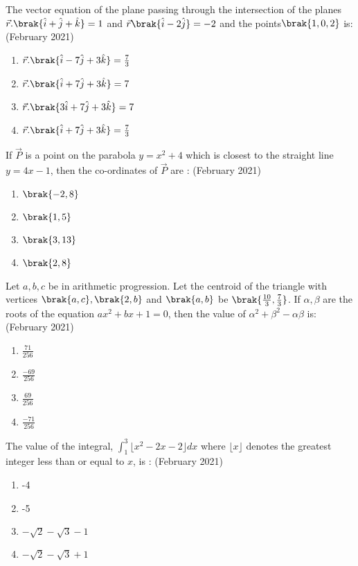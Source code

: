     \item The vector equation of the plane passing through the intersection of the planes $\vec{r}.\brak{\hat{i}+\hat{j}+\hat{k}}=1$ and $\vec{r}\brak{\hat{i}-2\hat{j}}=-2$ and the points$\brak{1,0,2}$ is:
  \hfill{(February 2021)} 
	\begin{enumerate}
        \item $\vec{r}.\brak{\hat{i}-7\hat{j}+3\hat{k}}=\frac{7}{3}$
        \item $\vec{r}.\brak{\hat{i}+7\hat{j}+3\hat{k}}=7$
        \item $\vec{r}.\brak{3\hat{i}+7\hat{j}+3\hat{k}}=7$
        \item $\vec{r}.\brak{\hat{i}+7\hat{j}+3\hat{k}}=\frac{7}{3}$
    \end{enumerate}
    \item If $\vec{P}$ is a point on the parabola $y = x^2 + 4$ which is closest to the straight line $y = 4x-1$, then the co-ordinates of $\vec{P}$ are :
    \hfill{(February 2021)} 
	\begin{enumerate}
        \item $\brak{-2,8}$
        \item $\brak{1,5}$
        \item $\brak{3,13}$
        \item $\brak{2,8}$
    \end{enumerate}
    \item Let $a, b, c$ be in arithmetic progression. Let the centroid of the triangle with vertices $\brak{a, c}, \brak{2, b}$ and $\brak{a, b}$ be $\brak{\frac{10}{3}, \frac{7}{3}}$. If $\alpha,\beta$ are the roots of the equation $ax^2 + bx + 1 = 0$, then the value of $\alpha^2 + \beta^2 - \alpha\beta$ is:
    \hfill{(February 2021)} 
	\begin{enumerate}
        \item $\frac{71}{256}$
        \item $\frac{-69}{256}$
        \item $\frac{69}{256}$
        \item $\frac{-71}{256}$ 
    \end{enumerate}
    \item The value of the integral, $\int_{1}^{3}\lfloor x^2 - 2x- 2\rfloor dx$ where $\lfloor x \rfloor$ denotes the greatest integer less than or equal to $x$, is :
   \hfill{(February 2021)} 
	\begin{enumerate}
        \item -4
        \item -5
        \item $-\sqrt{2}-\sqrt{3}-1$
        \item $-\sqrt{2}-\sqrt{3}+1$
    \end{enumerate}
